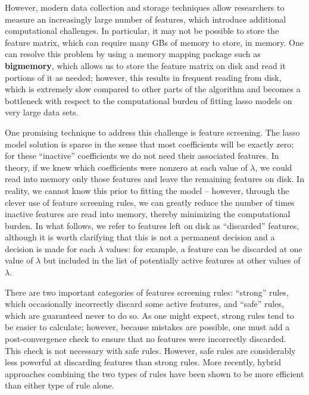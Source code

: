 \documentclass{article}
\begin{document}
However, modern data collection and storage techniques allow researchers to measure an increasingly large number of features, which introduce additional computational challenges. In particular, it may not be possible to store the feature matrix, which can require many GBs of memory to store, in memory. One can resolve this problem by using a memory mapping package such as \textbf{bigmemory}, which allows us to store the feature matrix on disk and read it portions of it as needed; however, this results in frequent reading from disk, which is extremely slow compared to other parts of the algorithm and becomes a bottleneck with respect to the computational burden of fitting lasso models on very large data sets.

One promising technique to address this challenge is feature screening. The lasso model solution is sparse in the sense that most coefficients will be exactly zero; for these ``inactive'' coefficients we do not need their associated features.  In theory, if we knew which coefficients were nonzero at each value of $\lambda$, we could read into memory only those features and leave the remaining features on disk. In reality, we cannot know this prior to fitting the model -- however, through the clever use of feature screening rules, we can greatly reduce the number of times inactive features are read into memory, thereby minimizing the computational burden.  In what follows, we refer to features left on disk as ``discarded'' features, although it is worth clarifying that this is not a permanent decision and a decision is made for each $\lambda$ values: for example, a feature can be discarded at one value of $\lambda$ but included in the list of potentially active features at other values of $\lambda$.

There are two important categories of features screening rules: ``strong'' rules\citep{tibshirani2011regression}\citep{qian2019fast}, which occasionally incorrectly discard some active features, and ``safe'' rules\citep{ghaoui2010safe,wang2013lasso,xiang2012fast, xiang2011learning}, which are guaranteed never to do so.  As one might expect, strong rules tend to be easier to calculate; however, because mistakes are possible, one must add a post-convergence check to ensure that no features were incorrectly discarded. This check is not necessary with safe rules. However, safe rules are considerably less powerful at discarding features than strong rules. More recently, hybrid approaches \citep{zeng2017efficient} combining the two types of rules have been shown to be more efficient than either type of rule alone.
\end{document}
